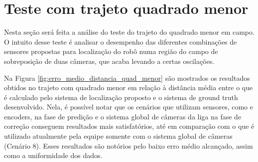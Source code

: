 \documentclass[acronym, symbols, table]{fei}
\begin{document}
%			
		
	\section{Teste com trajeto quadrado menor} \label{sec:resultados_quadrado_menor}
	
	Nesta seção será feita a análise do teste do trajeto do quadrado menor em campo. O intuito desse teste é analisar o desempenho das diferentes combinações de sensores propostas para localização do robô numa região do campo de sobreposição de duas câmeras, que acaba levando a certas oscilações.
	
	Na Figura \ref{fig:erro_medio_distancia_quad_menor} são mostrados os resultados obtidos no trajeto com quadrado menor em relação à distância média entre o que é calculado pelo sistema de localização proposto e o sistema de ground truth desenvolvido. Nela, é possível notar que os cenários que utilizam sensores, como  e encoders, na fase de predição e o sistema global de câmeras da liga na fase de correção conseguem resultados mais satisfatórios, até em comparação com o que é utilizado atualmente pela equipe somente com o sistema global de câmeras (Cenário 8). Esses resultados são notórios pelo baixo erro médio alcançado, assim como a uniformidade dos dados.
	
\end{document}
